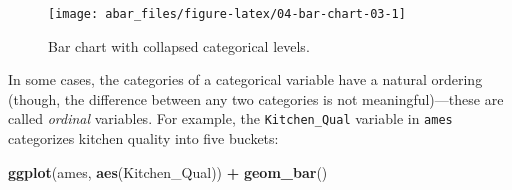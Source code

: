 \documentclass[]{book}
\newenvironment{Shaded}{\begin{snugshade}}{\end{snugshade}}
\newcommand{\DataTypeTok}[1]{\textcolor[rgb]{0.13,0.29,0.53}{#1}}
\newcommand{\DecValTok}[1]{\textcolor[rgb]{0.00,0.00,0.81}{#1}}
\newcommand{\KeywordTok}[1]{\textcolor[rgb]{0.13,0.29,0.53}{\textbf{#1}}}
\newcommand{\NormalTok}[1]{#1}
\newcommand{\OperatorTok}[1]{\textcolor[rgb]{0.81,0.36,0.00}{\textbf{#1}}}
\newcommand{\StringTok}[1]{\textcolor[rgb]{0.31,0.60,0.02}{#1}}
\theoremstyle{definition}
\theoremstyle{definition}
\theoremstyle{definition}
\theoremstyle{remark}
\begin{document}
\begin{Shaded}
\end{Shaded}

\begin{figure}

{\centering \texttt{[image: abar\_files/figure-latex/04-bar-chart-03-1]} 

}

\caption{Bar chart with collapsed categorical levels.}\label{fig:04-bar-chart-03}
\end{figure}

In some cases, the categories of a categorical variable have a natural
ordering (though, the difference between any two categories is not
meaningful)---these are called \emph{ordinal} variables. For example,
the \texttt{Kitchen\_Qual} variable in \texttt{ames} categorizes kitchen
quality into five buckets:

\begin{Shaded}
\end{Shaded}

\begin{Shaded}
\begin{Highlighting}[]
\KeywordTok{ggplot}\NormalTok{(ames, }\KeywordTok{aes}\NormalTok{(Kitchen_Qual)) }\OperatorTok{+}\StringTok{ }
\StringTok{  }\KeywordTok{geom_bar}\NormalTok{()}
\end{Highlighting}
\end{Shaded}
\end{document}
